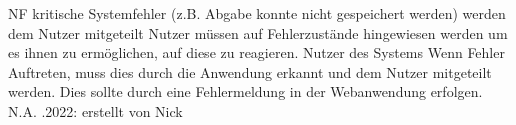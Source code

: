 \begin{myreq}
    \threeinline
    {\reqno}
    {\reqtype NF}
    {}
    \reqdesc kritische Systemfehler (z.B. Abgabe konnte nicht gespeichert werden) werden dem Nutzer mitgeteilt
    \reqrat Nutzer müssen auf Fehlerzustände hingewiesen werden um es ihnen zu ermöglichen, auf diese zu reagieren.
    \reqorig Nutzer des Systems
    \reqfit Wenn Fehler Auftreten, muss dies durch die Anwendung erkannt und dem Nutzer mitgeteilt werden. Dies sollte durch eine Fehlermeldung in der Webanwendung erfolgen.
    \twoinline
    {}
    {}
    \twoinline
    {}
    {\reqconf N.A.}
    \reqmater {}
    .2022: erstellt von Nick
\end{myreq}